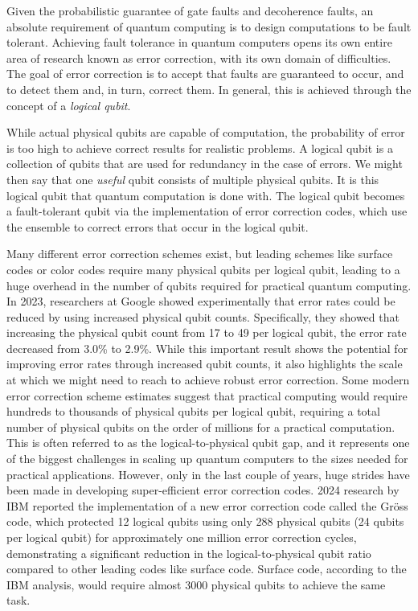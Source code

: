 \documentclass{elbioimp2}
\begin{document}
Given the probabilistic guarantee of gate faults and decoherence faults, an absolute requirement of quantum computing is to design computations to be fault tolerant. Achieving fault tolerance in quantum computers opens its own entire area of research known as error correction, with its own domain of difficulties. The goal of error correction is to accept that faults are guaranteed to occur, and to detect them and, in turn, correct them. In general, this is achieved through the concept of a \textit{logical qubit}.

While actual physical qubits are capable of computation, the probability of error is too high to achieve correct results for realistic problems. A logical qubit is a collection of qubits that are used for redundancy in the case of errors. We might then say that one \textit{useful} qubit consists of multiple physical qubits. It is this logical qubit that quantum computation is done with. The logical qubit becomes a fault-tolerant qubit via the implementation of error correction codes, which use the ensemble to correct errors that occur in the logical qubit.

Many different error correction schemes exist, but leading schemes like surface codes or color codes require many physical qubits per logical qubit, leading to a huge overhead in the number of qubits required for practical quantum computing. In 2023, researchers at Google showed experimentally that error rates could be reduced by using increased physical qubit counts\cite{GoogleQAI2023}. Specifically, they showed that increasing the physical qubit count from 17 to 49 per logical qubit, the error rate decreased from 3.0\% to 2.9\%. While this important result shows the potential for improving error rates through increased qubit counts, it also highlights the scale at which we might need to reach to achieve robust error correction. Some modern error correction scheme estimates suggest that practical computing would require hundreds to thousands of physical qubits per logical qubit, requiring a total number of physical qubits on the order of millions for a practical computation. This is often referred to as the logical-to-physical qubit gap, and it represents one of the biggest challenges in scaling up quantum computers to the sizes needed for practical applications. However, only in the last couple of years, huge strides have been made in developing super-efficient error correction codes. 2024 research by IBM reported the implementation of a new error correction code called the Gr\"oss code, which protected 12 logical qubits using only 288 physical qubits (24 qubits per logical qubit) for approximately one million error correction cycles, demonstrating a significant reduction in the logical-to-physical qubit ratio\cite{FTQM2024} compared to other leading codes like surface code. Surface code, according to the IBM analysis, would require almost 3000 physical qubits to achieve the same task.
\end{document}
